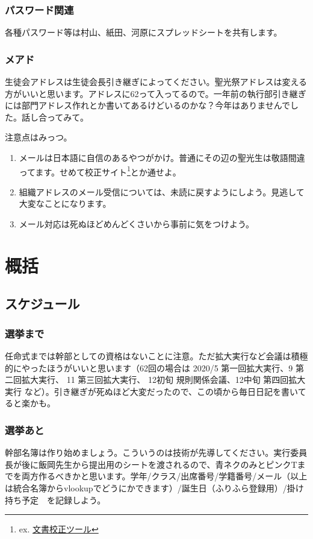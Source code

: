 \documentclass[dvipdfmx,jb5]{jreport}
\newcommand{\Chapter}[1]{\chapter{#1}\thispagestyle{fancy}}
\begin{document}
\subsection{パスワード関連}
各種パスワード等は村山、紙田、河原にスプレッドシートを共有します。

\subsection{メアド}
生徒会アドレスは生徒会長引き継ぎによってください。聖光祭アドレスは変える方がいいと思います。アドレスに62って入ってるので。一年前の執行部引き継ぎには部門アドレス作れとか書いてあるけどいるのかな？今年はありませんでした。話し合ってみて。

注意点はみっつ。
\begin{enumerate}
      \item メールは日本語に自信のあるやつがかけ。普通にその辺の聖光生は敬語間違ってます。せめて校正サイト\footnote{ex. \href{https://so-zou.jp/web-app/text/proofreading/}{文書校正ツール}}とか通せよ。
      \item 組織アドレスのメール受信については、未読に戻すようにしよう。見逃して大変なことになります。
      \item メール対応は死ぬほどめんどくさいから事前に気をつけよう。
\end{enumerate}

\Chapter{概括}
\section{スケジュール}
\subsection{選挙まで}
任命式までは幹部としての資格はないことに注意。ただ拡大実行など会議は積極的にやったほうがいいと思います（62回の場合は 2020/5 第一回拡大実行、9 第二回拡大実行、 11 第三回拡大実行、 12初旬 規則関係会議、12中旬 第四回拡大実行 など）。引き継ぎが死ぬほど大変だったので、この頃から毎日日記を書いてると楽かも。

\subsection{選挙あと}
幹部名簿は作り始めましょう。こういうのは技術が先導してください。実行委員長が後に飯岡先生から提出用のシートを渡されるので、青ネクのみとピンクTまでを両方作るべきかと思います。学年/クラス/出席番号/学籍番号/メール（以上は統合名簿からvlookupでどうにかできます）/誕生日（ふりふら登録用）/掛け持ち予定　を記録しよう。
\end{document}
